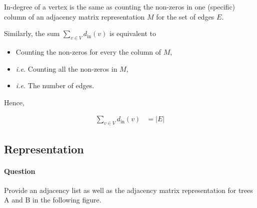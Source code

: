 \documentclass[11pt]{article}
\begin{document}
In-degree of a vertex is the same as counting the
non-zeros in one (specific) column of an adjacency
matrix representation \(M\) for the set of edges \(E\).

Similarly, the sum \(\sum_{v\in V}d_{\mathrm{in}}(v)\) is
equivalent to

\begin{itemize}
\item Counting the non-zeros for every the column of \(M\),
\item \emph{i.e.} Counting all the non-zeros in \(M\),
\item \emph{i.e.} The number of edges.
\end{itemize}

Hence,

\begin{align*}
  \sum_{v\in V} d_{\mathrm{in}}(v)
    &= |E|
\end{align*}



\subsection{Representation}
\label{sec:org94cc111}

\paragraph*{Question}
\label{sec:org10e36c4}
Provide an adjacency list as well as the adjacency matrix
representation for trees A and B in the following figure.
\end{document}

